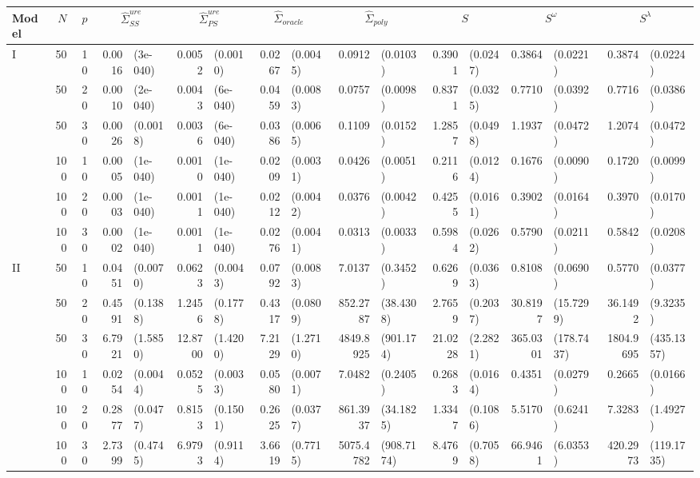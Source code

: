 \begin{landscape}
\begin{table}[H]
\begin{scriptsize}
\begin{tabular}{lrrrlrlrlrlrlrlrl}
   Model & $N$ & $p$ & \multicolumn{2}{c}{$\hat{\Sigma}^{ure}_{SS}$} & \multicolumn{2}{c}{$\hat{\Sigma}^{ure}_{PS}$} & \multicolumn{2}{c}{$\hat{\Sigma}_{oracle}$} & \multicolumn{2}{c}{$\hat{\Sigma}_{poly}$} & \multicolumn{2}{c}{$S$} & \multicolumn{2}{c}{$S^\omega$} & \multicolumn{2}{c}{$S^\lambda$}\\ \hline
I & 50 & 10 & 0.0016 & (3e-040) & 0.0052 & (0.0010) & 0.0267 & (0.0045) & 0.0912 & (0.0103) & 0.3901 & (0.0247) & 0.3864 & (0.0221) & 0.3874 & (0.0224) \\ 
    & 50 & 20 & 0.0010 & (2e-040) & 0.0043 & (6e-040) & 0.0459 & (0.0083) & 0.0757 & (0.0098) & 0.8371 & (0.0325) & 0.7710 & (0.0392) & 0.7716 & (0.0386) \\ 
    & 50 & 30 & 0.0026 & (0.0018) & 0.0036 & (6e-040) & 0.0386 & (0.0065) & 0.1109 & (0.0152) & 1.2857 & (0.0498) & 1.1937 & (0.0472) & 1.2074 & (0.0472) \\ 
    & 100 & 10 & 0.0005 & (1e-040) & 0.0010 & (1e-040) & 0.0209 & (0.0031) & 0.0426 & (0.0051) & 0.2116 & (0.0124) & 0.1676 & (0.0090) & 0.1720 & (0.0099) \\ 
    & 100 & 20 & 0.0003 & (1e-040) & 0.0011 & (1e-040) & 0.0212 & (0.0042) & 0.0376 & (0.0042) & 0.4255 & (0.0161) & 0.3902 & (0.0164) & 0.3970 & (0.0170) \\ 
    & 100 & 30 & 0.0002 & (1e-040) & 0.0011 & (1e-040) & 0.0276 & (0.0041) & 0.0313 & (0.0033) & 0.5984 & (0.0262) & 0.5790 & (0.0211) & 0.5842 & (0.0208) \\ 
   \hline
II & 50 & 10 & 0.0451 & (0.0070) & 0.0623 & (0.0043) & 0.0792 & (0.0083) & 7.0137 & (0.3452) & 0.6269 & (0.0363) & 0.8108 & (0.0690) & 0.5770 & (0.0377) \\ 
    & 50 & 20 & 0.4591 & (0.1388) & 1.2456 & (0.1778) & 0.4317 & (0.0809) & 852.2787 & (38.4308) & 2.7659 & (0.2037) & 30.8197 & (15.7299) & 36.1492 & (9.3235) \\ 
    & 50 & 30 & 6.7921 & (1.5850) & 12.8700 & (1.4200) & 7.2129 & (1.2710) & 4849.8925 & (901.174) & 21.0228 & (2.2821) & 365.0301 & (178.7437) & 1804.9695 & (435.1357) \\ 
    & 100 & 10 & 0.0254 & (0.0044) & 0.0525 & (0.0033) & 0.0580 & (0.0071) & 7.0482 & (0.2405) & 0.2683 & (0.0164) & 0.4351 & (0.0279) & 0.2665 & (0.0166) \\ 
    & 100 & 20 & 0.2877 & (0.0477) & 0.8153 & (0.1501) & 0.2625 & (0.0377) & 861.3937 & (34.1825) & 1.3347 & (0.1086) & 5.5170 & (0.6241) & 7.3283 & (1.4927) \\ 
    & 100 & 30 & 2.7399 & (0.4745) & 6.9793 & (0.9114) & 3.6619 & (0.7715) & 5075.4782 & (908.7174) & 8.4769 & (0.7058) & 66.9461 & (6.0353) & 420.2973 & (119.1735) \\ 

\end{tabular}
\end{scriptsize}
\end{table}
\end{landscape}
